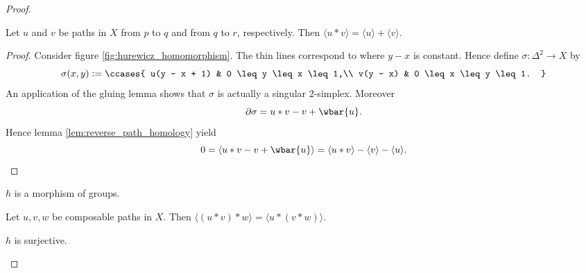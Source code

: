 \begin{proof}
	\begin{lemma}
		Let $u$ and $v$ be paths in $X$ from $p$ to $q$ and from $q$ to $r$, respectively. Then $\langle u \ast v \rangle = \langle u \rangle + \langle v \rangle$.
		\label{lem:concatenation_addition}
	\end{lemma}

	\begin{proof}
		Consider figure \ref{fig:hurewicz_homomorphism}. The thin lines correspond to where $y - x$ is constant. Hence define $\sigma : \Delta^2 \to X$ by
		\begin{equation*}
			\sigma(x,y) := \ccases{
				u(y - x + 1) & 0 \leq y \leq x \leq 1,\\
				v(y - x) & 0 \leq x \leq y \leq 1.
			}
		\end{equation*}
		An application of the gluing lemma shows that $\sigma$ is actually a singular $2$-simplex. Moreover
		\begin{equation*}
			\partial \sigma = u \ast v - v + \wbar{u}.
		\end{equation*}
		Hence lemma \ref{lem:reverse_path_homology} yield
		\begin{equation*}
			0 = \langle u \ast v - v + \wbar{u}\rangle = \langle u \ast v \rangle - \langle v \rangle - \langle u \rangle.
		\end{equation*}
	\end{proof}

	\begin{corollary}
		$h$ is a morphism of groups.
		\label{cor:h_homomorphism}
	\end{corollary}

	\begin{corollary}
		Let $u,v,w$ be composable paths in $X$. Then $\langle (u \ast v) \ast w \rangle = \langle u \ast (v \ast w) \rangle$.
		\label{cor:composable_associative_homology}
	\end{corollary}

	\begin{lemma}
		$h$ is surjective.
	\end{lemma}


\end{proof}

